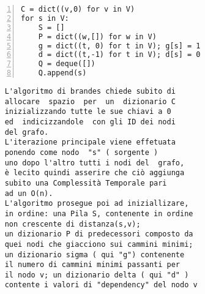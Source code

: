 \begin{minipage}{0.49\linewidth}
	\begin{Verbatim}[frame=topline,numbers=left,label=Codice,framesep=3mm]
C = dict((v,0) for v in V)
for s in V:
	S = []
	P = dict((w,[]) for w in V)
	g = dict((t, 0) for t in V); g[s] = 1
	d = dict((t,-1) for t in V); d[s] = 0
	Q = deque([])
	Q.append(s)
	\end{Verbatim}
\end{minipage}\hfill
\begin{minipage}{0.49\linewidth}
	\begin{Verbatim}
	L'algoritmo di brandes chiede subito di
	allocare  spazio  per  un  dizionario C 
	inizializzando tutte le sue chiavi a 0 
	ed  indicizzandole  con gli ID dei nodi 
	del grafo. 
	L'iterazione principale viene effetuata
	ponendo come nodo  "s" ( sorgente )
	uno dopo l'altro tutti i nodi del  grafo, 
	è lecito quindi asserire che ciò aggiunga 
	subito una Complessità Temporale pari 
	ad un O(n).
	L'algoritmo prosegue poi ad iniziallizare,
	in ordine: una Pila S, contenente in ordine
	non crescente di distanza(s,v);
	un dizionario P di predecessori composto da 
	quei nodi che giacciono sui cammini minimi;
	un dizionario sigma ( qui "g") contenente
	il numero di cammini minimi passanti per 
	il nodo v; un dizionario delta ( qui "d" )
	contente i valori di "dependency" del nodo v
	\end{Verbatim}

\end{minipage}
\newline \newline